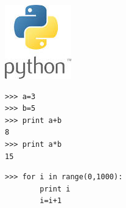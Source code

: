 \begin{center}
	\includegraphics[width=.2\linewidth]{./IMG/python.jpg}
\end{center}
%
%
%
%
%
%
%

\begin{lstlisting}[style=PythonStyle, label=lst:PythonCode]
>>> a=3
>>> b=5
>>> print a+b
8
>>> print a*b
15
\end{lstlisting}

\begin{lstlisting}[style=PythonStyle, label=lst:PythonCode]
>>> for i in range(0,1000):
        print i
        i=i+1
\end{lstlisting}

\vfill\null
\pagebreak

